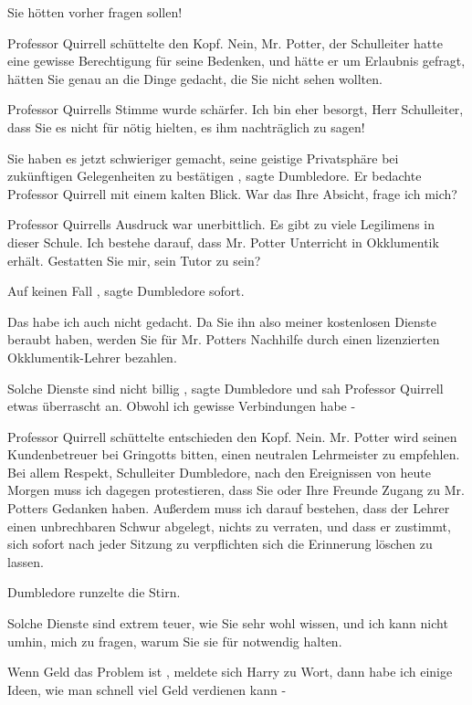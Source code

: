 \glqq Sie hötten vorher fragen sollen!\grqq{}

Professor Quirrell schüttelte den Kopf. \glqq Nein, Mr. Potter, der Schulleiter
hatte eine gewisse Berechtigung für seine Bedenken, und hätte er um Erlaubnis
gefragt, hätten Sie genau an die Dinge gedacht, die Sie nicht sehen
wollten.\grqq{}

Professor Quirrells Stimme wurde schärfer. \glqq Ich bin eher besorgt, Herr
Schulleiter, dass Sie es nicht für nötig hielten, es ihm nachträglich zu
sagen!\grqq{}

\glqq Sie haben es jetzt schwieriger gemacht, seine geistige Privatsphäre bei
zukünftigen Gelegenheiten zu bestätigen\grqq{} , sagte Dumbledore. Er bedachte
Professor Quirrell mit einem kalten Blick. \glqq War das Ihre Absicht, frage ich
mich?\grqq{}

Professor Quirrells Ausdruck war unerbittlich. \glqq Es gibt zu viele Legilimens
in dieser Schule. Ich bestehe darauf, dass Mr. Potter Unterricht in Okklumentik
erhält. Gestatten Sie mir, sein Tutor zu sein?\grqq{}

\glqq Auf keinen Fall\grqq{} , sagte Dumbledore sofort.

\glqq Das habe ich auch nicht gedacht. Da Sie ihn also meiner kostenlosen
Dienste beraubt haben, werden Sie für Mr. Potters Nachhilfe durch einen
lizenzierten Okklumentik-Lehrer bezahlen.\grqq{}

\glqq Solche Dienste sind nicht billig\grqq{} , sagte Dumbledore und sah
Professor Quirrell etwas überrascht an. \glqq Obwohl ich gewisse Verbindungen
habe -\grqq{}

Professor Quirrell schüttelte entschieden den Kopf. \glqq Nein. Mr. Potter wird
seinen Kundenbetreuer bei Gringotts bitten, einen neutralen Lehrmeister zu
empfehlen. Bei allem Respekt, Schulleiter Dumbledore, nach den Ereignissen von
heute Morgen muss ich dagegen protestieren, dass Sie oder Ihre Freunde Zugang zu
Mr. Potters Gedanken haben. Außerdem muss ich darauf bestehen, dass der Lehrer
einen unbrechbaren Schwur abgelegt, nichts zu verraten, und dass er zustimmt,
sich sofort nach jeder Sitzung zu verpflichten sich die Erinnerung löschen zu
lassen.\grqq{}

Dumbledore runzelte die Stirn.

\glqq Solche Dienste sind extrem teuer, wie Sie sehr wohl wissen, und ich kann
nicht umhin, mich zu fragen, warum Sie sie für notwendig halten.\grqq{}

\glqq Wenn Geld das Problem ist\grqq{} , meldete sich Harry zu Wort, \glqq dann
habe ich einige Ideen, wie man schnell viel Geld verdienen kann -\grqq{}

